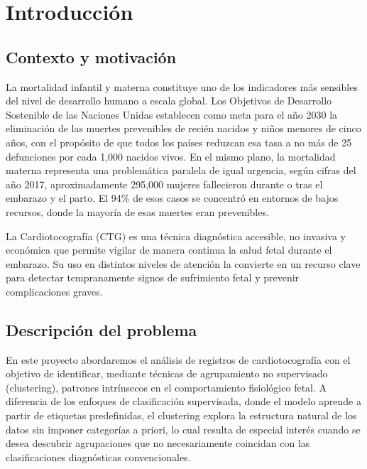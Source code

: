 \documentclass[12pt,letterpaper]{article}
\begin{document}


\newpage

\tableofcontents

\newpage

\section{Introducción}

\subsection{Contexto y motivación}

La mortalidad infantil y materna constituye uno de los indicadores más sensibles del nivel de
desarrollo humano a escala global. Los Objetivos de Desarrollo Sostenible de las Naciones Unidas
establecen como meta para el año 2030 la eliminación de las muertes prevenibles de recién nacidos
y niños menores de cinco años, con el propósito de que todos los países reduzcan esa tasa a no más
de 25 defunciones por cada 1,000 nacidos vivos. En el mismo plano, la mortalidad materna
representa una problemática paralela de igual urgencia, según cifras del año 2017, aproximadamente
295,000 mujeres fallecieron durante o tras el embarazo y el parto. El 94\% de esos casos se
concentró en entornos de bajos recursos, donde la mayoría de esas muertes eran prevenibles.

La Cardiotocografía (CTG) es una técnica diagnóstica accesible, no invasiva y económica que permite vigilar de manera continua la salud fetal durante el embarazo. Su uso en distintos niveles de atención la convierte en un recurso clave para detectar tempranamente signos de sufrimiento fetal y prevenir complicaciones graves.

\subsection{Descripción del problema}

En este proyecto abordaremos el análisis de registros de cardiotocografía con el objetivo de
identificar, mediante técnicas de agrupamiento no supervisado (clustering), patrones intrínsecos
en el comportamiento fisiológico fetal. A diferencia de los enfoques de clasificación supervisada,
donde el modelo aprende a partir de etiquetas predefinidas, el clustering explora la estructura
natural de los datos sin imponer categorías a priori, lo cual resulta de especial interés cuando
se desea descubrir agrupaciones que no necesariamente coincidan con las clasificaciones
diagnósticas convencionales.
\end{document}

